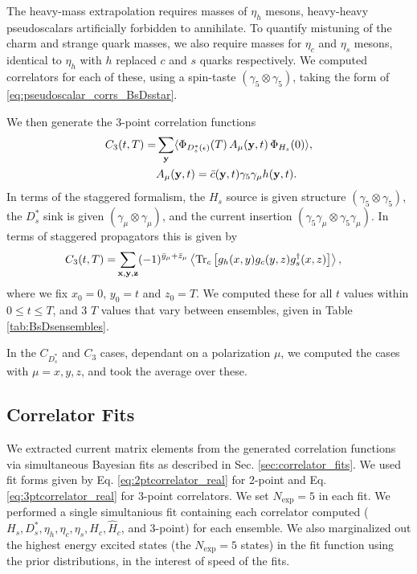 The heavy-mass extrapolation requires masses of $\eta_h$ mesons, heavy-heavy pseudoscalars artificially forbidden to annihilate. To quantify mistuning of the charm and strange quark masses, we also require masses for $\eta_c$ and $\eta_s$ mesons, identical to $\eta_h$ with $h$ replaced $c$ and $s$ quarks respectively. We computed correlators for each of these, using a spin-taste $(\gamma_5\otimes \gamma_5)$, taking the form of \eqref{eq:pseudoscalar_corrs_BsDsstar}.

We then generate the 3-point correlation functions
\begin{align}
  C_3(t,T) =& \sum_{{\bf{y}}} \langle \Phi_{D_s^*(\epsilon)}(T)\, A_{\mu}({\bf{y}},t) \,\Phi_{H_s}(0) \rangle, \\
  &A_{\mu}({\bf{y}},t) = \bar{c}({\bf{y}},t) \gamma_5\gamma_{\mu} h({\bf{y}},t). \nonumber
\end{align}
In terms of the staggered formalism, the $H_s$ source is given structure $(\gamma_5\otimes \gamma_5)$, the $D_s^*$ sink is given $(\gamma_{\mu}\otimes \gamma_{\mu})$, and the current insertion $(\gamma_5\gamma_{\mu}\otimes \gamma_5\gamma_{\mu})$. In terms of staggered propagators this is given by
\begin{align}
  C_3(t,T) =& \sum_{{\bf{x},\bf{y},\bf{z}}} (-1)^{\bar{y}_{\mu}+\bar{z}_{\mu}}\left\langle \text{Tr}_c\left[ g_h(x,y)g_c(y,z) g^{\dagger}_s(x,z) \right] \right\rangle,
\end{align}
where we fix $x_0 = 0$, $y_0=t$ and $z_0=T$. We computed these for all $t$ values within $0\leq t\leq T$, and 3 $T$ values that vary between ensembles, given in Table \ref{tab:BsDsensembles}.

In the $C_{D_s^*}$ and $C_3$ cases, dependant on a polarization $\mu$, we computed the cases with $\mu = x,y,z$, and took the average over these.

\subsection{Correlator Fits}
\label{sec:BsDsstar_fits}

We extracted current matrix elements from the generated correlation functions via simultaneous Bayesian fits as described in Sec. \ref{sec:correlator_fits}. We used fit forms given by Eq. \eqref{eq:2ptcorrelator_real} for 2-point and Eq. \eqref{eq:3ptcorrelator_real} for 3-point correlators. We set $N_{\text{exp}}=5$ in each fit. We performed a single simultanious fit containing each correlator computed ($H_s,D_s^*,\eta_h,\eta_c,\eta_s,H_c,\hat{H}_c$, and 3-point) for each ensemble. We also marginalized out the highest energy excited states (the $N_{\text{exp}}=5$ states) in the fit function using the prior distributions, in the interest of speed of the fits.

